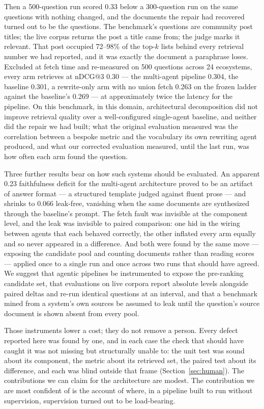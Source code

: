 \documentclass[acmsmall,review,anonymous,screen]{acmart}
\begin{document}
Then a 500-question run scored 0.33 below a 300-question run on the same
questions with nothing changed, and the documents the repair had recovered
turned out to be the questions. The benchmark's questions are community post
titles; the live corpus returns the post a title came from; the judge marks it
relevant. That post occupied 72--98\% of the top-$k$ lists behind every
retrieval number we had reported, and it was exactly the document a paraphrase
loses. Excluded at fetch time and re-measured on 500 questions across 24
ecosystems, every arm retrieves at nDCG@3 0.30 --- the multi-agent pipeline
0.304, the baseline 0.301, a rewrite-only arm with no union fetch 0.263 on the
frozen ladder against the baseline's 0.269 --- at approximately twice the
latency for the pipeline. On this benchmark, in this domain, architectural
decomposition did not improve retrieval quality over a well-configured
single-agent baseline, and neither did the repair we had built; what the
original evaluation measured was the correlation between a bespoke metric and
the vocabulary its own rewriting agent produced, and what our corrected
evaluation measured, until the last run, was how often each arm found the
question.

Three further results bear on how such systems should be evaluated. An apparent
0.23 faithfulness deficit for the multi-agent architecture proved to be an
artifact of answer format --- a structured template judged against fluent prose
--- and shrinks to 0.066 leak-free, vanishing when the same documents are
synthesized through the baseline's prompt. The fetch fault was invisible at the
component level, and the leak was invisible to paired comparison: one hid in
the wiring between agents that each behaved correctly, the other inflated every
arm equally and so never appeared in a difference. And both were found by the
same move --- exposing the candidate pool and counting documents rather than
reading scores --- applied once to a single run and once across two runs that
should have agreed. We suggest that agentic pipelines be instrumented to expose
the pre-ranking candidate set, that evaluations on live corpora report absolute
levels alongside paired deltas and re-run identical questions at an interval,
and that a benchmark mined from a system's own sources be assumed to leak until
the question's source document is shown absent from every pool.

Those instruments lower a cost; they do not remove a person. Every defect
reported here was found by one, and in each case the check that should have
caught it was not missing but structurally unable to: the unit test was sound
about its component, the metric about its retrieved set, the paired test about
its difference, and each was blind outside that frame
(Section~\ref{sec:human}). The contributions we can claim for the architecture
are modest. The contribution we are most confident of is the account of where,
in a pipeline built to run without supervision, supervision turned out to be
load-bearing.
\end{document}
